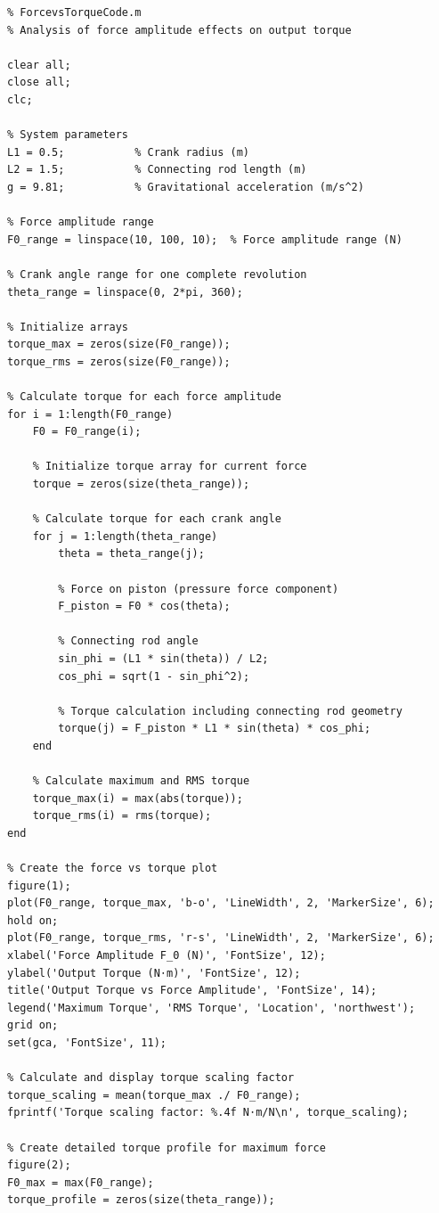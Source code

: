 \documentclass[10pt]{article}
\begin{document}
\begin{verbatim}
% ForcevsTorqueCode.m
% Analysis of force amplitude effects on output torque

clear all;
close all;
clc;

% System parameters
L1 = 0.5;           % Crank radius (m)
L2 = 1.5;           % Connecting rod length (m)
g = 9.81;           % Gravitational acceleration (m/s^2)

% Force amplitude range
F0_range = linspace(10, 100, 10);  % Force amplitude range (N)

% Crank angle range for one complete revolution
theta_range = linspace(0, 2*pi, 360);

% Initialize arrays
torque_max = zeros(size(F0_range));
torque_rms = zeros(size(F0_range));

% Calculate torque for each force amplitude
for i = 1:length(F0_range)
    F0 = F0_range(i);
    
    % Initialize torque array for current force
    torque = zeros(size(theta_range));
    
    % Calculate torque for each crank angle
    for j = 1:length(theta_range)
        theta = theta_range(j);
        
        % Force on piston (pressure force component)
        F_piston = F0 * cos(theta);
        
        % Connecting rod angle
        sin_phi = (L1 * sin(theta)) / L2;
        cos_phi = sqrt(1 - sin_phi^2);
        
        % Torque calculation including connecting rod geometry
        torque(j) = F_piston * L1 * sin(theta) * cos_phi;
    end
    
    % Calculate maximum and RMS torque
    torque_max(i) = max(abs(torque));
    torque_rms(i) = rms(torque);
end

% Create the force vs torque plot
figure(1);
plot(F0_range, torque_max, 'b-o', 'LineWidth', 2, 'MarkerSize', 6);
hold on;
plot(F0_range, torque_rms, 'r-s', 'LineWidth', 2, 'MarkerSize', 6);
xlabel('Force Amplitude F_0 (N)', 'FontSize', 12);
ylabel('Output Torque (N⋅m)', 'FontSize', 12);
title('Output Torque vs Force Amplitude', 'FontSize', 14);
legend('Maximum Torque', 'RMS Torque', 'Location', 'northwest');
grid on;
set(gca, 'FontSize', 11);

% Calculate and display torque scaling factor
torque_scaling = mean(torque_max ./ F0_range);
fprintf('Torque scaling factor: %.4f N⋅m/N\n', torque_scaling);

% Create detailed torque profile for maximum force
figure(2);
F0_max = max(F0_range);
torque_profile = zeros(size(theta_range));


\end{verbatim}
\end{document}
